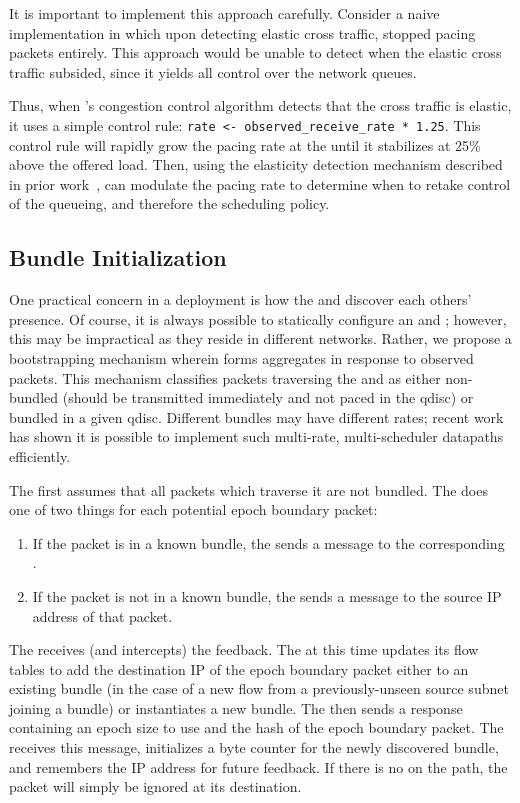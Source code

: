 It is important to implement this approach carefully. 
Consider a naive implementation in which upon detecting elastic cross traffic, \name stopped pacing packets entirely.
This approach would be unable to detect when the elastic cross traffic subsided, since it yields all control over the network queues.

Thus, when \name's congestion control algorithm detects that the cross traffic is elastic, it uses a simple control rule: \texttt{rate <- observed\_receive\_rate * 1.25}. 
This control rule will rapidly grow the pacing rate at the \inbox until it stabilizes at 25\% above the offered load.
Then, using the elasticity detection mechanism described in prior work~\cite{nimbus}, \inbox can modulate the pacing rate to determine when to retake control of the queueing, and therefore the scheduling policy.

 

\subsection{Bundle Initialization}\label{s:impl:discovery}

One practical concern in a \name deployment is how the \inbox and \outbox discover each others' presence. Of course, it is always possible to statically configure an \inbox and \outbox; however, this may be impractical as they reside in different networks.
Rather, we propose a bootstrapping mechanism wherein \name forms aggregates in response to observed packets.
This mechanism classifies packets traversing the \inbox and \outbox as either non-bundled (should be transmitted immediately and not paced in the qdisc) or bundled in a given qdisc. Different bundles may have different rates; recent work~\cite{carousel, eifel} has shown it is possible to implement such multi-rate, multi-scheduler datapaths efficiently.

The \inbox first assumes that all packets which traverse it are not bundled.
The \outbox does one of two things for each potential epoch boundary packet:
\begin{enumerate}
    \item If the packet is in a known bundle, the \outbox sends a message to the corresponding \inbox.
    \item If the packet is not in a known bundle, the \outbox sends a message to the source IP address of that packet.
\end{enumerate}

The \inbox receives (and intercepts) the \outbox feedback.  
The \inbox at this time updates its flow tables to add the destination IP of the epoch boundary packet either to an existing bundle (in the case of a new flow from a previously-unseen source subnet joining a bundle) or instantiates a new bundle.
The \inbox then sends a response containing an epoch size to use and the hash of the epoch boundary packet.
The \outbox receives this message, initializes a byte counter for the newly discovered bundle, and remembers the \inbox IP address for future feedback. If there is no \inbox on the path, the packet will simply be ignored at its destination. 


